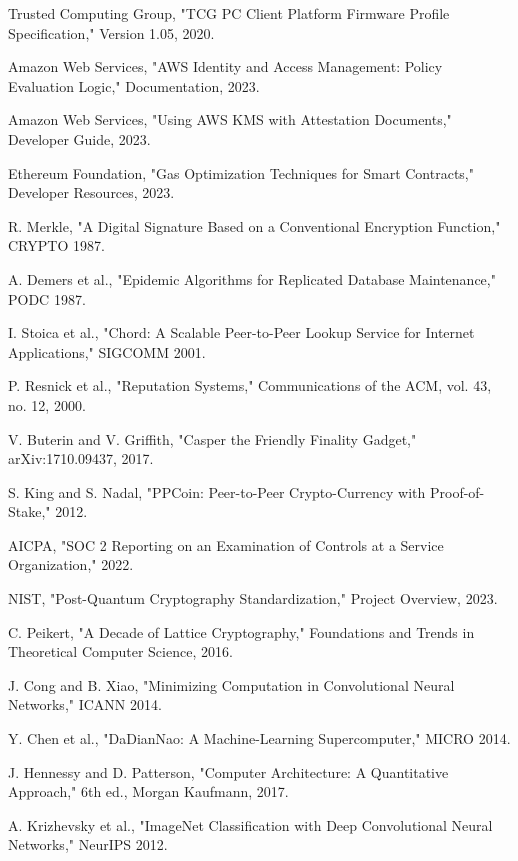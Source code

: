 \documentclass[12pt,a4paper]{article}
\begin{document}
\begin{thebibliography}{99}
Trusted Computing Group, "TCG PC Client Platform Firmware Profile Specification," Version 1.05, 2020.

Amazon Web Services, "AWS Identity and Access Management: Policy Evaluation Logic," Documentation, 2023.

Amazon Web Services, "Using AWS KMS with Attestation Documents," Developer Guide, 2023.

Ethereum Foundation, "Gas Optimization Techniques for Smart Contracts," Developer Resources, 2023.

R. Merkle, "A Digital Signature Based on a Conventional Encryption Function," CRYPTO 1987.

A. Demers et al., "Epidemic Algorithms for Replicated Database Maintenance," PODC 1987.

I. Stoica et al., "Chord: A Scalable Peer-to-Peer Lookup Service for Internet Applications," SIGCOMM 2001.

P. Resnick et al., "Reputation Systems," Communications of the ACM, vol. 43, no. 12, 2000.

V. Buterin and V. Griffith, "Casper the Friendly Finality Gadget," arXiv:1710.09437, 2017.

S. King and S. Nadal, "PPCoin: Peer-to-Peer Crypto-Currency with Proof-of-Stake," 2012.

AICPA, "SOC 2 Reporting on an Examination of Controls at a Service Organization," 2022.

NIST, "Post-Quantum Cryptography Standardization," Project Overview, 2023.

C. Peikert, "A Decade of Lattice Cryptography," Foundations and Trends in Theoretical Computer Science, 2016.

J. Cong and B. Xiao, "Minimizing Computation in Convolutional Neural Networks," ICANN 2014.

Y. Chen et al., "DaDianNao: A Machine-Learning Supercomputer," MICRO 2014.

J. Hennessy and D. Patterson, "Computer Architecture: A Quantitative Approach," 6th ed., Morgan Kaufmann, 2017.

A. Krizhevsky et al., "ImageNet Classification with Deep Convolutional Neural Networks," NeurIPS 2012.


\end{thebibliography}
\end{document}
